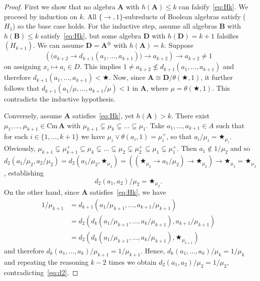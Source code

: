 \documentclass{amsart}
\newcommand{\alg}[1]{\mathbf{#1}}
\newcommand{\cm}[1]{\mathrm{Cm}\, #1}
\def\ra{\rightarrow}
\def\op{\bigstar}
\begin{document}
\begin{proof}
First we show that no 
algebra $\alg{A}$ with $h(\alg{A})\leq k$ can falsify~\eqref{eq:Hk}. 
We proceed by induction on $k$. All $\{\ra,1\}$-subreducts of Boolean algebras
satisfy ($H_1$) so the base case holds.
For the inductive step, assume all algebras $\alg{B}$ with
$h(\alg{B}) \leq k$ satisfy~\eqref{eq:Hk}, but some
algebra $\alg{D}$ with $h(\alg{D}) = k+1$ falsifies
$(H_{k+1})$. We can assume $\alg{D} = \alg{A}^\oplus$ with
$h(\alg{A}) = k$. 
Suppose
$$
\left(\bigl(a_{k+2}\ra d_{k+1}(a_1,\dots,a_{k+1})\bigr)\ra
  a_{k+2}\right) \ra a_{k+2}\neq 1
$$
on assigning
$x_i \mapsto a_i\in D$. This implies
$1\neq a_{k+2}\not\leq d_{k+1}(a_1,\dots,a_{k+1})$ and therefore
$d_{k+1}(a_1,\dots,a_{k+1})<\op$. Now, since
$\alg{A} \cong \alg{D}/\theta(\op,1)$, it further follows that
$d_{k+1}(a_1/\mu,\dots,a_{k+1}/\mu)<1$ in $\alg{A}$, where
$\mu=\theta(\op,1)$. This contradicts the inductive hypothesis.


Conversely, assume $\alg{A}$ satisfies~\eqref{eq:Hk}, yet $h(\alg{A})> k$.  
There exist $\mu_1,\dots,\mu_{k+1}\in\cm{\alg{A}}$ with
$\mu_{k+1}\subsetneq \mu_k\subsetneq\dots\subsetneq
\mu_1$. Take $a_1,\dots,a_{k+1}\in A$ such that for each $i\in\{1,\dots,k+1\}$ we
have $\mu_i\vee\theta(a_i,1) = \mu_i^+$, so that
$a_i/\mu_i = \op_{\mu_i}$. Obviously,
$\mu_{k+1}\subsetneq\mu_{k+1}^+\subseteq\mu_k\subsetneq\dots\subsetneq
\mu_2\subsetneq\mu_2^+\subseteq\mu_1\subsetneq \mu_1^+$.
Then $a_1\notin 1/\mu_2$ and so
$d_2(a_1/\mu_2,a_2/\mu_2) = d_2(a_1/\mu_2,\op_{\mu_2}) = 
((\op_{\mu_2}\ra a_1/\mu_2)\ra \op_{\mu_2})\ra\op_{\mu_2}
= \op_{\mu_2}$, establishing
\begin{equation}\label{eq:d2}
d_2(a_1,a_2)/\mu_2 = \op_{\mu_2}.
\end{equation}  
On the other hand, since $\alg{A}$ satisfies~\eqref{eq:Hk}, we
have
\begin{align*}
1/\mu_{k+1}
&= d_{k+1}(a_1/\mu_{k+1},\dots, a_{k+1}/\mu_{k+1})\\
&= d_2(d_{k}(a_1/\mu_{k+1},\dots,a_{k}/\mu_{k+1}),a_{k+1}/\mu_{k+1})\\
&= d_2(d_{k}(a_1/\mu_{k+1},\dots,a_{k}/\mu_{k+1}),\op_{\mu_{k+1}})
\end{align*}
and therefore $d_{k}(a_1,\dots,a_{k})/\mu_{k+1} = 1/\mu_{k+1}$. Hence,
$d_{k}(a_1,\dots,a_{k})/\mu_{k} = 1/\mu_{k}$ and repeating the
reasoning $k-2$ times we obtain $d_2(a_1,a_2)/\mu_2 = 1/\mu_2$,
contradicting~\eqref{eq:d2}.
\end{proof}
\end{document}
